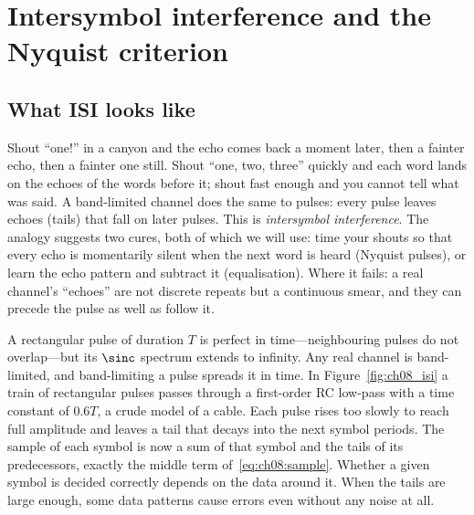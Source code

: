 \section{Intersymbol interference and the Nyquist criterion}
\label{sec:ch08:nyquist}

\subsection{What ISI looks like}

\begin{analogy}
Shout ``one!'' in a canyon and the echo comes back a moment later, then a fainter echo, then a
fainter one still. Shout ``one, two, three'' quickly and each word lands on the echoes of the
words before it; shout fast enough and you cannot tell what was said. A band-limited channel
does the same to pulses: every pulse leaves echoes (tails) that fall on later pulses. This is
\emph{intersymbol interference}. The analogy suggests two cures, both of which we will use:
time your shouts so that every echo is momentarily silent when the next word is heard
(Nyquist pulses), or learn the echo pattern and subtract it (equalisation). Where it fails: a
real channel's ``echoes'' are not discrete repeats but a continuous smear, and they can
precede the pulse as well as follow it.
\end{analogy}

A rectangular pulse of duration $T$ is perfect in time---neighbouring pulses do not overlap---but
its $\sinc$ spectrum extends to infinity. Any real channel is band-limited, and band-limiting a
pulse spreads it in time. In Figure~\ref{fig:ch08_isi} a train of rectangular pulses passes
through a first-order RC low-pass with a time constant of $0.6T$, a crude model of a cable.
Each pulse rises too slowly to reach full amplitude and leaves a tail that decays into the next
symbol periods. The sample of each symbol is now a sum of that symbol and the tails of its
predecessors, exactly the middle term of~\eqref{eq:ch08:sample}. Whether a given symbol is
decided correctly depends on the data around it. When the tails are large enough, some data
patterns cause errors even without any noise at all.


